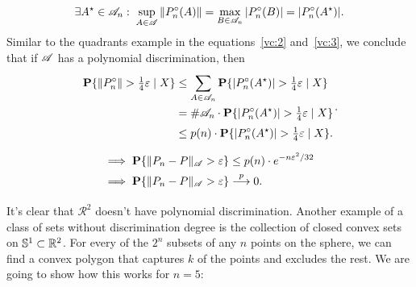 \[\exists A^\star \in \AA_n:\; \sup_{A\in \AA} \|P_n^\circ (A)\| = \max_{B\in \AA_n} | P_n^\circ(B) | = | {P_n^\circ(A^\star )}|.  \] 
Similar to the quadrants example in the equations~\ref{vc:2} and~\ref{vc:3}, we conclude that if $\AA$ has a polynomial discrimination, then
\begin{equation}\label{vc:5}
    \everymath{\displaystyle}\arraycolsep=1.4pt\def\arraystretch{1.5}
    \begin{array}{rcl}
    \P\{ \|P_n^\circ\| > \tfrac{1}{4} \varepsilon \;|\; X \} & \leq & \sum_{A\in\AA_n}\P\{ |P_n^\circ(A^\star)| > \tfrac{1}{4} \varepsilon \;|\; X \}\\
    & = & \# \AA_n \cdot\P\{ |P_n^\circ(A^\star)| > \tfrac{1}{4} \varepsilon \;|\; X \}\\
    & \leq & p(n) \cdot \P\{ |P_n^\circ(A^\star)| > \tfrac{1}{4} \varepsilon \;|\; X \} .
  \end{array}.
\end{equation}
\begin{equation}\label{vc:6}
     \everymath{\displaystyle}\arraycolsep=1.4pt\def\arraystretch{1.5}
     \begin{array}{rl}
        \implies & \P\{\|P_n-P\|_{\AA} > \varepsilon\} \leq p(n) \cdot e^{-n \varepsilon^2 / 32}\\
        \implies & \P\{\|P_n-P\|_\AA > \varepsilon\} \overset{p}{\longrightarrow} 0.
    \end{array}
\end{equation}

\vspace*{1em}

It's clear that $\mathcal{R}^2$ doesn't have polynomial discrimination. Another example of a class of sets without discrimination degree is the collection of closed convex sets on $\S^1 \subset \R^2$. For every of the $2^n$ subsets of any $n$ points on the sphere, we can find a convex polygon that captures $k$ of the points and excludes the rest. We are going to show how this works for $n = 5$: 


